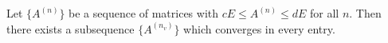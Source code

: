 Let $\{A^{(n)}\}$ be a sequence of matrices with $cE \leq A^{(n)} \leq dE$ for all $n$. Then there exists a subsequence $\{A^{(n_v)}\}$ which converges in every entry.
